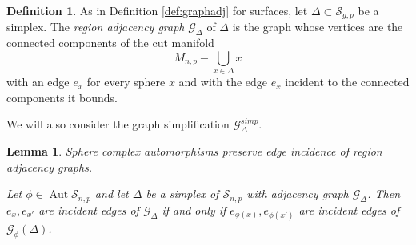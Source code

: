 \documentclass[11pt]{article}
\DeclareMathOperator{\aaut}{Aut}
\newtheorem{lemma}[theorem]{Lemma}
\theoremstyle{remark}
\theoremstyle{definition}
\newtheorem{definition}[theorem]{Definition}
\begin{document}
\begin{definition}
  As in Definition \ref{def:graphadj} for surfaces,
  let $\Delta \subset \mathcal S_{g,p}$ be a simplex.
  The \emph{region adjacency graph}
  $\mathcal G_\Delta$
  of $\Delta$
  is the graph whose vertices are the connected components
  of the cut manifold
  $$
  M_{n,p} - \bigcup_{x \in \Delta} x
  $$
  with an edge $e_x$ for every sphere $x$ and with
  the edge $e_x$ incident to the connected components it bounds.

  We will also consider the graph simplification
  $\mathcal G^{simp}_\Delta$.
\end{definition}

\begin{lemma}
  Sphere complex automorphisms preserve edge incidence of region adjacency graphs.

  Let $\phi \in \aaut \mathcal S_{n,p}$ and let $\Delta$ be a simplex of $\mathcal S_{n,p}$ with adjacency graph $\mathcal G_\Delta$.
  Then $e_x, e_{x'}$ are incident edges of $\mathcal G_\Delta$
  if and only if $e_{\phi(x)}, e_{\phi(x')}$ are incident
  edges of $\mathcal G_\phi(\Delta)$.
  \label{lemma:outlinegraph}
\end{lemma}
\end{document}
